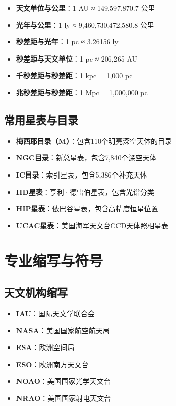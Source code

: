 \documentclass[12pt,UTF8]{ctexbook}
\begin{document}
\begin{itemize}
  \item \textbf{天文单位与公里}：1 AU ≈ 149,597,870.7 公里
  \item \textbf{光年与公里}：1 ly ≈ 9,460,730,472,580.8 公里
  \item \textbf{秒差距与光年}：1 pc ≈ 3.26156 ly
  \item \textbf{秒差距与天文单位}：1 pc ≈ 206,265 AU
  \item \textbf{千秒差距与秒差距}：1 kpc = 1,000 pc
  \item \textbf{兆秒差距与秒差距}：1 Mpc = 1,000,000 pc
\end{itemize}

\section{常用星表与目录}

\begin{itemize}
  \item \textbf{梅西耶目录（M）}：包含110个明亮深空天体的目录
  \item \textbf{NGC目录}：新总星表，包含7,840个深空天体
  \item \textbf{IC目录}：索引星表，包含5,386个补充天体
  \item \textbf{HD星表}：亨利·德雷伯星表，包含光谱分类
  \item \textbf{HIP星表}：依巴谷星表，包含高精度恒星位置
  \item \textbf{UCAC星表}：美国海军天文台CCD天体照相星表
\end{itemize}

\chapter{专业缩写与符号}
\section{天文机构缩写}

\begin{itemize}
  \item \textbf{IAU}：国际天文学联合会
  \item \textbf{NASA}：美国国家航空航天局
  \item \textbf{ESA}：欧洲空间局
  \item \textbf{ESO}：欧洲南方天文台
  \item \textbf{NOAO}：美国国家光学天文台
  \item \textbf{NRAO}：美国国家射电天文台
\end{itemize}
\end{document}
